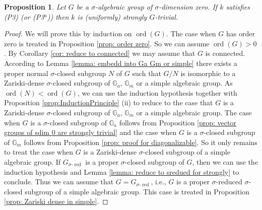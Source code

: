 \documentclass[oneside,reqno]{amsart}
\newtheorem{prop}[theo]{Proposition}
\theoremstyle{definition}
\newcommand{\G}{\mathcal{G}}
\newcommand{\ord}{\operatorname{ord}}
\newcommand{\N}{\mathcal{N}}
\newcommand{\s}{\sigma}
\newcommand{\Gm}{\mathbb{G}_m}
\newcommand{\Ga}{\mathbb{G}_a}
\newcommand{\sred}{{\sigma\text{-}\operatorname{red}}}
\newcommand{\pt}{{\rm{(P3$^u$)}}}
\newcommand{\ptweak}{{\rm{(P3)}}}
\begin{document}
\begin{prop} \label{prop: sdim zero}
	Let $G$ be a $\s$-algebraic group of $\s$-dimension zero. If $k$ satisfies \ptweak{} (or \pt{}) then $k$ is (uniformly) strongly $G$-trivial.
\end{prop}
\begin{proof}
	We will prove this by induction on $\ord(G)$.
	The case when $G$ has order zero is treated in Proposition \ref{prop: order zero}. So we can assume $\ord(G)>0$.
	By Corollary \ref{cor: reduce to connected} we may assume that $G$ is connected. 
	According to Lemma \ref{lemma: embedd into Ga Gm or simple} there exists a proper normal $\s$-closed subgroup $N$ of $G$ such that $G/N$ is isomorphic to a Zariski-dense $\s$-closed subgroup of $\Ga$, $\Gm$ or a simple algebraic group. 
	As $\ord(N)<\ord(G)$, we can use the induction hypothesis together with Proposition \ref{prop:InductionPrinciple} (ii) to reduce to the case that $G$ is a Zariski-dense $\s$-closed subgroup of $\Ga$, $\Gm$ or a simple algebraic group. The case when $G$ is a $\s$-closed subgroup of $\Ga$ follows from Proposition \ref{prop: vector groups of sdim 0 are strongly trivial} and the case when $G$ is a $\s$-closed subgroup of $\Gm$ follows from Proposition \ref{prop: proof for diagonalizable}. So it only remains to treat the case when $G$ is a Zariski-dense $\s$-closed subgroup of a simple algebraic group. If $G_\sred$ is a proper $\s$-closed subgroup of $G$, then we can use the induction hypothesis and Lemma \ref{lemma: reduce to sredued for strongly} to conclude. Thus we can assume that $G=G_\sred$, i.e., $G$ is a proper $\s$-reduced $\s$-closed subgroup of a simple algebraic group. This case is treated in Proposition \ref{prop: Zariski dense in simple}.	
%	
%	
%	
%	
%	
%	
%	
%	

\end{proof}
\end{document}
